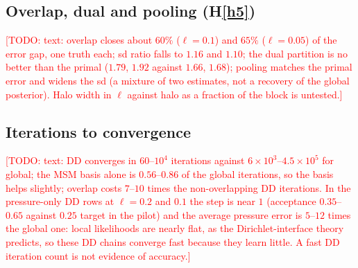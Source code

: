 \documentclass[11pt]{article}
\newcommand{\todo}[1]{\textcolor{red}{[TODO: #1]}}
\begin{document}
\subsection{Overlap, dual and pooling (H\ref{h5})}
\begin{table}[h]\centering\small
\resizebox{\linewidth}{!}{}
\caption{Overlap with Robin flux against the non-overlapping primal, flux, $4\times4$, truth $2026$ (generated from \texttt{master\_table.csv}). The halo-4 run at $\ell=0.05$ is withdrawn: its extended boundaries are off the flux lines, so it ran as a Dirichlet method without flux.}\label{tab:overlap}
\end{table}
\todo{text: overlap closes about $60\%$ ($\ell=0.1$) and $65\%$ ($\ell=0.05$) of the error gap, one truth each; sd ratio falls to $1.16$ and $1.10$; the dual partition is no better than the primal ($1.79$, $1.92$ against $1.66$, $1.68$); pooling matches the primal error and widens the sd (a mixture of two estimates, not a recovery of the global posterior). Halo width in $\ell$ against halo as a fraction of the block is untested.}

\subsection{Iterations to convergence}\label{sec:iters}
\begin{table}[h]\centering\scriptsize
\setlength{\tabcolsep}{3pt}
\resizebox{\linewidth}{!}{}
\caption{Iterations to sup-MPSRF $<1.2$ for every method of an experiment group (same $\ell$, data type and $4\times4$ blocks, truth $2026$), with the ratio to the global pCN of the group, the frozen pCN step $\beta$ (median over blocks for DD), the acceptance rate after burn-in, the error ratio of the posterior mean to global, and the average relative pressure-data error of the posterior fields with its ratio to global (global and MSM rows: median over saved chain states; DD rows: median over assembled fields). One DD iteration updates every block in parallel, one global iteration is one full forward solve, so the iteration ratio is not a work ratio (see the cost accounting). Generated from \texttt{master\_table.csv} and the run summaries by \texttt{make\_tables.py}; the full table for $2\times2$, $4\times4$ and $8\times8$ blocks is \texttt{tab\_iterations\_full.tex} (appendix).}\label{tab:iterations}
\end{table}
\todo{text: DD converges in $60$--$10^4$ iterations against $6\times10^3$--$4.5\times10^5$ for global; the MSM basis alone is $0.56$--$0.86$ of the global iterations, so the basis helps slightly; overlap costs $7$--$10$ times the non-overlapping DD iterations. In the pressure-only DD rows at $\ell=0.2$ and $0.1$ the step is near $1$ (acceptance $0.35$--$0.65$ against $0.25$ target in the pilot) and the average pressure error is $5$--$12$ times the global one: local likelihoods are nearly flat, as the Dirichlet-interface theory predicts, so these DD chains converge fast because they learn little. A fast DD iteration count is not evidence of accuracy.}
\end{document}
